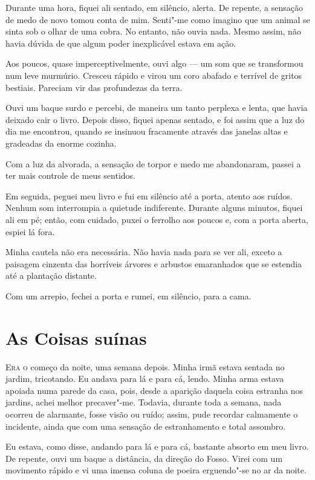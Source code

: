 Durante uma hora, fiquei ali sentado, em silêncio, alerta. De repente, a sensação de medo de novo tomou
conta de mim. Senti"-me como imagino que um animal se sinta sob o olhar de uma cobra. No entanto, não ouvia nada. Mesmo
assim, não havia dúvida de que algum poder inexplicável estava em ação.

Aos poucos, quase imperceptivelmente, ouvi algo --- um som que se transformou num leve murmúrio. Cresceu rápido e
virou um coro abafado e terrível de gritos bestiais. Pareciam vir das profundezas da terra.

Ouvi um baque surdo e percebi, de maneira um tanto perplexa e lenta, que havia deixado cair o livro. Depois disso,
fiquei apenas sentado, e foi assim que a luz do dia me encontrou, quando se insinuou fracamente através das janelas
altas e gradeadas da enorme cozinha.

Com a luz da alvorada, a sensação de torpor e medo me abandonaram, passei a ter mais controle de meus sentidos.

Em seguida, peguei meu livro e fui em silêncio até a porta, atento aos ruídos. Nenhum som interrompia a quietude
indiferente. Durante alguns minutos, fiquei ali em pé; então, com cuidado, puxei o ferrolho aos poucos e, com a
porta aberta, espiei lá fora.                                                                                          

Minha cautela não era necessária. Não havia nada para se ver ali, exceto a paisagem cinzenta das horríveis árvores e 
arbustos emaranhados que se estendia até a plantação distante.

Com um arrepio, fechei a porta e rumei, em silêncio, para a cama. 


\clearpage

\chapter{As Coisas suínas}

\textsc{Era o} começo da noite, uma semana depois. Minha irmã estava sentada no jardim, tricotando. Eu andava para lá e para cá,
lendo. Minha arma estava apoiada numa parede da casa, pois, desde a aparição daquela coisa estranha nos jardins, achei
melhor precaver"-me. Todavia, durante toda a semana, nada ocorreu de alarmante, fosse visão ou ruído; assim, pude
recordar calmamente o incidente, ainda que com uma sensação de estranhamento e total assombro.

Eu estava, como disse, andando para lá e para cá, bastante absorto em meu livro. De repente, ouvi um baque a distância,
da direção do Fosso. Virei com um movimento rápido e vi uma imensa coluna de poeira erguendo"-se no ar da noite.

